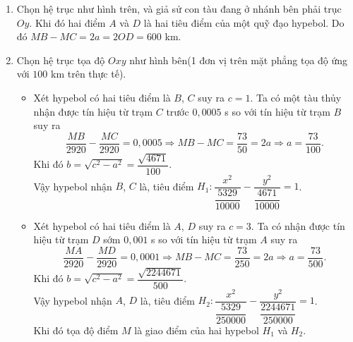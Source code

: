 \begin{bt}
{\begin{enumerate}
	\item Chọn hệ trục như hình trên, và giả sử con tàu đang ở nhánh bên phải trục $Oy$.	Khi đó hai điểm $A$ và $D$ là hai tiêu điểm của một quỹ đạo hypebol. Do đó $MB-MC=2a=2OD=600$ km.
	\item Chọn hệ trục tọa độ $Oxy$ như hình bên(1 đơn vị trên mặt phẳng tọa độ ứng với $100$ km trên thực tế). 
	\begin{itemize}
		\item Xét hypebol có hai tiêu điểm là $B$, $C$ suy ra $c=1$. Ta có một tàu thủy nhận được tín hiệu từ trạm $C$ trước $0{,}0005$ s so với tín hiệu từ trạm $B$ suy ra
		\[\dfrac{MB}{2920}-\dfrac{MC}{2920}=0{,}0005\Rightarrow MB-MC= \dfrac{73}{50}=2a\Rightarrow a=\dfrac{73}{100}.\]
		Khi đó $b=\sqrt{c^2-a^2}=\dfrac{\sqrt{4671}}{100}$.\\
		Vậy hypebol nhận $B$, $C$ là, tiêu điểm $H_1\colon \dfrac{x^2}{\dfrac{5329}{10000}}-\dfrac{y^2}{\dfrac{4671}{10000}}=1$.
		\item Xét hypebol có hai tiêu điểm là $A$, $D$ suy ra $c=3$. Ta có  nhận được tín hiệu từ trạm $D$ sớm $0{,} 001$ s so với tín hiệu từ trạm $A$ suy ra
		\[\dfrac{MA}{2920}-\dfrac{MD}{2920}=0{,}0001\Rightarrow MB-MC= \dfrac{73}{250}=2a\Rightarrow a=\dfrac{73}{500}.\]
		Khi đó $b=\sqrt{c^2-a^2}=\dfrac{\sqrt{2244671}}{500}$.\\
		Vậy hypebol nhận $A$, $D$ là, tiêu điểm $H_2\colon \dfrac{x^2}{\dfrac{5329}{250000}}-\dfrac{y^2}{\dfrac{2244671}{250000}}=1$.\\
		Khi đó tọa độ điểm $M$ là giao điểm của hai hypebol $H_1$ và $H_2$.
	\end{itemize}
\end{enumerate} 
	
	}
\end{bt}


